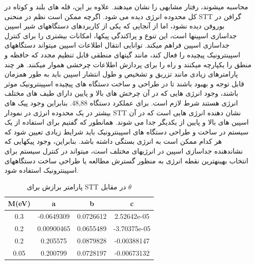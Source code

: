 محاسبه میشوند، رفتار مشابهی را نشان میدهند. علاوه بر این، قله های بلند و کوتاه در کل محدوده انرژی دیده می شود. اگرچه ممکن است نظم در منحنی STT گرافن در بوروفن دیده نشود، اما از آنجایی که یکی از کاربردهای دستگاههای شیر اسپین جداسازی اسپینها است، این تنوع و پراکندگی پیکها، امکانات بیشتری را برای کنترل جداسازی اسپین فراهم میکند. توانایی انتقال اطلاعات اسپین میتواند دستگاههای اسپینترونیک پیچیده را فعال کند، مانند گیتهای منطقی قابل تنظیم مجدد که حافظه و منطق را یکپارچه میکنند و راه را برای پردازش اطلاعات چرخشی هموار میکنند. هر چند پارامترهای زیادی مانند تزریق و تشخیص و طول انتشار اسپین باید به طور همزمان قابل توجه و بهبود باشند تا در طراحی و ساخت دستگاه های پیچیده اسپینترونیک موثر باشند، وجود انرژی هایی که در آن چرخش های بالا و پایین دارای طیف های مختلف انرژی هستند شرط لازم است. برای عملکرد دستگاه 48,88. بنابراین وجود پیک های بیشتر در یک محدوده انرژی در نمودار STT نشان دهنده انرژی هایی است که در آن اسپین های بالا و پایین از یکدیگر جدا می شوند. همانطور که گفتیم برای استفاده از یک سیستم در ساخت و طراحی دستگاه های اسپینترونیک باید شرایط زیادی تعیین شود که هر کدام ممکن است به انرژی بستگی داشته باشد. بنابراین، وجود پیکهایی که نشاندهنده جداسازی اسپین در انرژیهای مختلف است، میتواند در کنترل سیستم برای انتخاب بهینهترین نقطه انرژی به منظور گسترش مطالعه یا طراحی ساخت دستگاههای اسپینترونیک استفاده شود.
\begin{table}[t]
    \centering
      \caption{ پارامتر برازش برای STT در مقابل $\theta$}
      \label{tbl:fitting}
      \begin{tabular}{cccc}
        \toprule
        M(eV) & a & b & c \\
        \midrule
        0.3 & -0.0649309 & 0.0726612 & 2.52642e-05 \\
        0.2 & 0.00900465 & 0.0655489 & -3.70375e-05 \\
        0.2 & 0.205575 & 0.0879828 & -0.00388147 \\
        0.05 & 0.200799 & 0.0728197 & -0.00673132 \\
        \bottomrule
      \end{tabular}
    \end{table}

